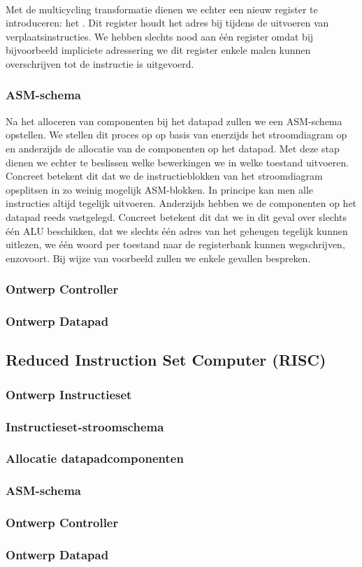 \paragraph{}
Met de multicycling transformatie dienen we echter een nieuw register te introduceren: het . Dit register houdt het adres bij tijdens de uitvoeren van verplaatsinstructies. We hebben slechts nood aan \'e\'en register omdat bij bijvoorbeeld impliciete adressering we dit register enkele malen kunnen overschrijven tot de instructie is uitgevoerd.
\subsubsection{ASM-schema}
Na het alloceren van componenten bij het datapad zullen we een ASM-schema opstellen. We stellen dit proces op op basis van enerzijds het stroomdiagram op  en anderzijds de allocatie van de componenten op het datapad. Met deze stap dienen we echter te beslissen welke bewerkingen we in welke toestand uitvoeren. Concreet betekent dit dat we de instructieblokken van het stroomdiagram opsplitsen in zo weinig mogelijk ASM-blokken. In principe kan men alle instructies altijd tegelijk uitvoeren. Anderzijds hebben we de componenten op het datapad reeds vastgelegd. Concreet betekent dit dat we in dit geval over slechts \'e\'en ALU beschikken, dat we slechts \'e\'en adres van het geheugen tegelijk kunnen uitlezen, we \'e\'en woord per toestand naar de registerbank kunnen wegschrijven, enzovoort. Bij wijze van voorbeeld zullen we enkele gevallen bespreken.
\subsubsection{Ontwerp Controller}
\subsubsection{Ontwerp Datapad}
\subsection{Reduced Instruction Set Computer (RISC)}
\subsubsection{Ontwerp Instructieset}
\subsubsection{Instructieset-stroomschema}
\subsubsection{Allocatie datapadcomponenten}
\subsubsection{ASM-schema}
\subsubsection{Ontwerp Controller}
\subsubsection{Ontwerp Datapad}
